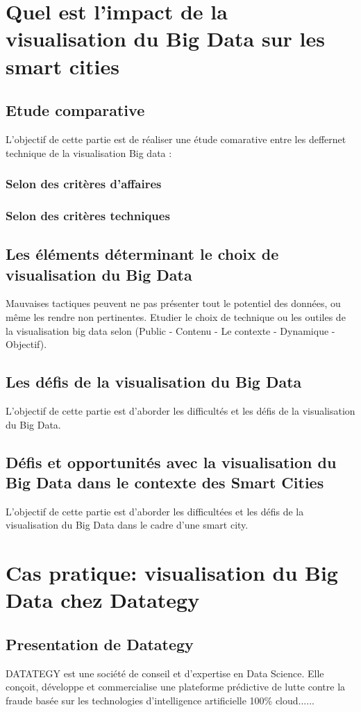 \documentclass[french, a4paper, 12pt]{report}
\begin{document}
\chapter{Quel est l'impact de la visualisation du Big Data sur les smart cities}
\section{Etude comparative }
L’objectif de cette partie est de réaliser une étude comarative entre les deffernet technique de la visualisation Big data :
\subsection{Selon des critères d'affaires}
\subsection{Selon des critères techniques}

\section{Les éléments déterminant le choix de visualisation du Big Data}
Mauvaises tactiques peuvent ne pas présenter tout le potentiel des données, ou même les rendre non pertinentes. Etudier le choix de technique ou les outiles de la visualisation big data selon (Public - Contenu - Le contexte - Dynamique - Objectif).
\section{Les défis de la visualisation du Big Data}
L’objectif de cette partie est d’aborder les difficultés et les défis de la visualisation du Big Data. 
\section{Défis et opportunités avec la visualisation du Big Data dans le contexte des Smart Cities}
L’objectif de cette partie est d’aborder les difficultées et les défis de la visualisation du Big Data dans le cadre d’une smart city. 

\chapter{Cas pratique: visualisation du Big Data chez Datategy}
\section{Presentation de Datategy}
DATATEGY est une société de conseil et d’expertise en Data Science. Elle conçoit, développe et commercialise une plateforme prédictive de lutte contre la fraude basée sur les technologies d’intelligence artificielle 100\% cloud......
\end{document}
